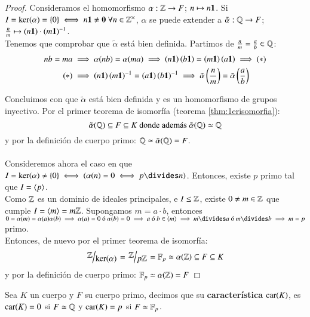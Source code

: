 \begin{proof}
    Consideramos el homomorfismo $\alpha: \mathbb{Z} \to F$; $n \mapsto n \mathbf{1}$. Si $I = \ker(\alpha) = \setdef{0} \iff n \1 \neq \0\ \forall n \in \Z^\times$, $\alpha$ se puede extender a  $\tilde\alpha: \mathbb{Q} \to F$; $\frac{n}{m} \mapsto (n \mathbf{1}) \cdot (m \mathbf{1})^{-1}$.\\

    Tenemos que comprobar que $\tilde\alpha$ está bien definida. Partimos de $\frac{n}{m} = \frac{a}{b} \in \mathbb{Q}$:
    \begin{align*}
        nb = ma &\implies \alpha(nb) = \alpha(ma) \implies \left(n \mathbf{1}\right)\left(b \mathbf{1}\right) = \left(m \mathbf{1}\right)\left(a \mathbf{1}\right) \implies (*)\\
        (*) &\implies \left(n \mathbf{1}\right)\left(m \mathbf{1}\right)^{-1} = \left(a \mathbf{1}\right)\left(b \mathbf{1}\right)^{-1} \implies \tilde\alpha\left(\frac{n}{m}\right) = \tilde\alpha\left(\frac{a}{b}\right)
    \end{align*}

    Concluimos con que $\tilde\alpha$ está bien definida y es un homomorfismo de grupos inyectivo. Por el primer teorema de isomorfía (teorema \ref{thm:1erisomorfia}):
    $$
        \tilde\alpha(\mathbb{Q}) \subseteq F \subseteq K \text{ donde además } \tilde\alpha(\mathbb{Q}) \simeq \mathbb{Q}
    $$
    y por la definición de cuerpo primo: $\mathbb{Q} \simeq \tilde\alpha(\mathbb{Q}) = F$.\\\\

    Consideremos ahora el caso en que $I = \ker(\alpha) \neq \setdef{0} \iff (\alpha(n) = 0 \iff p \divides n)$. Entonces, existe $p$ primo tal que $I = \langle p\rangle$.\\
    Como $\mathbb{Z}$ es un dominio de ideales principales, e $I \leq \mathbb{Z}$, existe $0 \neq m \in \mathbb{Z}$ que cumple $I = \langle m\rangle = m\mathbb{Z}$. Supongamos $m = a \cdot b$, entonces $0 = \alpha(m) = \alpha(a) \alpha(b) \implies \alpha(a) = 0 \text{ ó } \alpha(b) = 0 \implies a \text{ ó } b \in \gen{m} \implies m\divides a \text{ ó } m \divides b \implies m = p $ primo.\\

    Entonces, de nuevo por el primer teorema de isomorfía:
    $$
        \quo{\Z}{\ker(\alpha)} = \quo{\Z}{p\Z} = \F_p \isom \alpha(\Z) \subseteq F \subseteq K
    $$
    y por la definición de cuerpo primo: $\mathbb{F}_p \simeq \alpha(\mathbb{Z}) = F$
\end{proof}

\begin{dfn}
    Sea $K$ un cuerpo y $F$ su cuerpo primo, decimos que su \textbf{característica} $\mathrm{car}(K)$, es $\mathrm{car}(K) = 0$ si $F \simeq \mathbb{Q}$ y $\mathrm{car}(K) = p$ si $F \simeq \mathbb{F}_p$.
\end{dfn}

